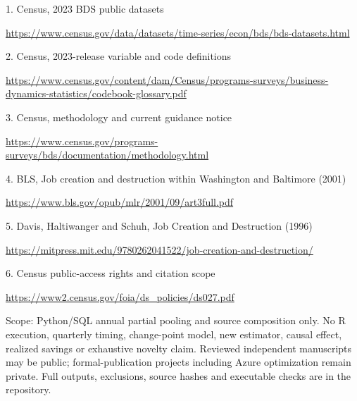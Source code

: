 \documentclass[11pt]{article}
\begin{document}
\small
1. Census, 2023 BDS public datasets\par\url{https://www.census.gov/data/datasets/time-series/econ/bds/bds-datasets.html}\par
2. Census, 2023-release variable and code definitions\par\url{https://www.census.gov/content/dam/Census/programs-surveys/business-dynamics-statistics/codebook-glossary.pdf}\par
3. Census, methodology and current guidance notice\par\url{https://www.census.gov/programs-surveys/bds/documentation/methodology.html}\par
4. BLS, Job creation and destruction within Washington and Baltimore (2001)\par\url{https://www.bls.gov/opub/mlr/2001/09/art3full.pdf}\par
5. Davis, Haltiwanger and Schuh, Job Creation and Destruction (1996)\par\url{https://mitpress.mit.edu/9780262041522/job-creation-and-destruction/}\par
6. Census public-access rights and citation scope\par\url{https://www2.census.gov/foia/ds_policies/ds027.pdf}\par
\normalsize\par
Scope: Python/SQL annual partial pooling and source composition only. No R execution, quarterly timing, change-point model, new estimator, causal effect, realized savings or exhaustive novelty claim. Reviewed independent manuscripts may be public; formal-publication projects including Azure optimization remain private. Full outputs, exclusions, source hashes and executable checks are in the repository.
\end{document}
